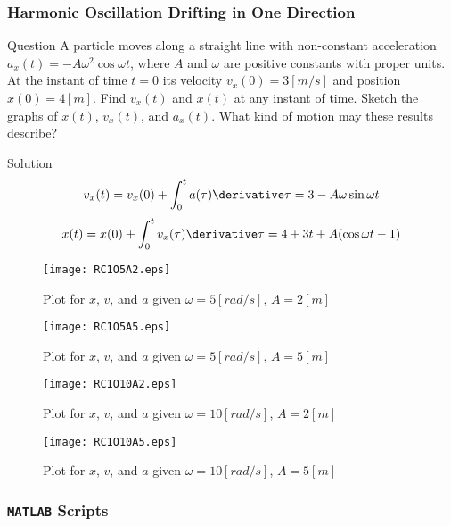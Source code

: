 \begin{frame}
\frametitle{Harmonic Oscillation Drifting in One Direction}
\begin{block}{Question}
A particle moves along a straight line with non-constant acceleration $a_x(t)=-A\omega^{2}\cos\omega t$, where $A$ and $\omega$ are positive constants with \alert{proper units}. At the instant of time $t=0$ its \alert{velocity} $v_x(0)=3\unit{[m/s]}$ and \alert{position} $x(0)=4\unit{[m]}$. Find $v_{x}(t)$ and $x(t)$ at any instant of time. Sketch the graphs of $x(t)$, $v_{x}(t)$, and $a_{x}(t)$. What kind of motion may these results describe?
\end{block}
\begin{block}{Solution}
\[
v_x(t)=v_x(0)+\int_{0}^{t}a(\tau)\derivative\tau=3-A\omega\sin\omega t
\]
\[
x(t)=x(0)+\int_{0}^{t}v_{x}(\tau)\derivative\tau=4+3t+A(\cos\omega t-1)
\]
\end{block}
\end{frame}
\begin{frame}
\begin{figure}[H]
\centering
\texttt{[image: RC1O5A2.eps]}
\caption{Plot for $x$, $v$, and $a$ given $\omega=5\unit{[rad/s]}$, $A=2\unit{[m]}$}
\end{figure}
\end{frame}
\begin{frame}
\begin{figure}[H]
\centering
\texttt{[image: RC1O5A5.eps]}
\caption{Plot for $x$, $v$, and $a$ given $\omega=5\unit{[rad/s]}$, $A=5\unit{[m]}$}
\end{figure}
\end{frame}
\begin{frame}
\begin{figure}[H]
\centering
\texttt{[image: RC1O10A2.eps]}
\caption{Plot for $x$, $v$, and $a$ given $\omega=10\unit{[rad/s]}$, $A=2\unit{[m]}$}
\end{figure}
\end{frame}
\begin{frame}
\begin{figure}[H]
\centering
\texttt{[image: RC1O10A5.eps]}
\caption{Plot for $x$, $v$, and $a$ given $\omega=10\unit{[rad/s]}$, $A=5\unit{[m]}$}
\end{figure}
\end{frame}
\begin{frame}
\frametitle{\texttt{MATLAB} Scripts}

\end{frame}
